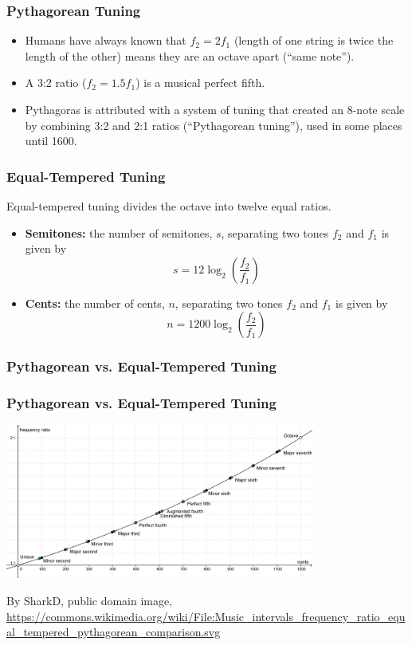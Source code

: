\documentclass{beamer}
\begin{document}
\begin{frame}
  \frametitle{Pythagorean Tuning}
  \begin{itemize}
  \item Humans have always known that $f_2=2f_1$ (length of one string
    is twice the length of the other) means they are an octave apart
    (``same note'').
  \item A 3:2 ratio ($f_2=1.5f_1$) is a musical perfect fifth.
  \item Pythagoras is attributed with a system of tuning that created
    an 8-note scale by combining 3:2 and 2:1 ratios (``Pythagorean
    tuning''), used in some places until 1600.
  \end{itemize}
\end{frame}

\begin{frame}
  \frametitle{Equal-Tempered Tuning}

  Equal-tempered tuning divides the octave into twelve equal ratios.
  \begin{itemize}
  \item {\bf Semitones:} the number of semitones, $s$, separating two
    tones $f_2$ and $f_1$ is given by
    \[
    s = 12\log_2\left(\frac{f_2}{f_1}\right)
    \]
  \item {\bf Cents:} the number of cents, $n$, separating two tones
    $f_2$ and $f_1$ is given by
    \[
    n = 1200\log_2\left(\frac{f_2}{f_1}\right)
    \]
  \end{itemize}
\end{frame}

\begin{frame}
  \frametitle{Pythagorean vs. Equal-Tempered Tuning}
  \centerline{}
\end{frame}

\begin{frame}
  \frametitle{Pythagorean vs. Equal-Tempered Tuning}
  \centerline{\includegraphics[height=2in]{Music_intervals.png}}
  \begin{tiny}
    By SharkD, public domain image,
    \url{https://commons.wikimedia.org/wiki/File:Music_intervals_frequency_ratio_equal_tempered_pythagorean_comparison.svg}
  \end{tiny}
\end{frame}
\end{document}
